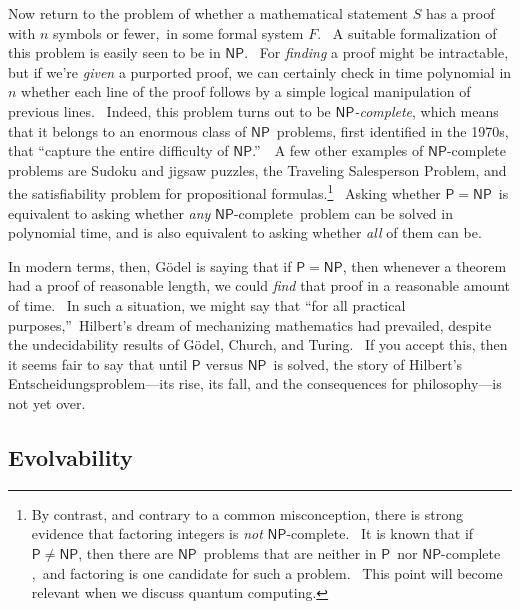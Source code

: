 \documentclass[11pt,onecolumn]{article}%
\begin{document}
Now return to the problem of whether a mathematical statement $S$ has a proof
with $n$ symbols or fewer,\ in some formal system $F$. \ A suitable
formalization of this problem is easily seen to be in $\mathsf{NP}$. \ For
\textit{finding} a proof might be intractable, but if we're \textit{given} a
purported proof, we can certainly check in time polynomial in $n$ whether each
line of the proof follows by a simple logical manipulation of previous lines.
\ Indeed, this problem turns out to be $\mathsf{NP}$\textit{-complete}, which
means that it belongs to an enormous class of $\mathsf{NP}$\ problems, first
identified in the 1970s, that \textquotedblleft capture the entire difficulty
of $\mathsf{NP}$.\textquotedblright\ \ A few other examples of $\mathsf{NP}%
$-complete problems are Sudoku and jigsaw puzzles, the Traveling Salesperson
Problem, and the satisfiability problem for propositional
formulas.\footnote{\label{FACTOR}By contrast, and contrary to a common
misconception, there is strong evidence that factoring integers is
\textit{not} $\mathsf{NP}$-complete. \ It is known that if $\mathsf{P}%
\neq\mathsf{NP}$, then there are $\mathsf{NP}$\ problems that are neither in
$\mathsf{P}$\ nor $\mathsf{NP}$-complete \cite{ladner},\ and factoring is one
candidate for such a problem. \ This point will become relevant when we
discuss quantum computing.} \ Asking whether $\mathsf{P}=\mathsf{NP}$\ is
equivalent to asking whether \textit{any} $\mathsf{NP}$-complete\ problem can
be solved in polynomial time, and is also equivalent to asking whether
\textit{all} of them can be.

In modern terms, then, G\"{o}del is saying that if $\mathsf{P}=\mathsf{NP}$,
then whenever a theorem had a proof of reasonable length, we could
\textit{find} that proof in a reasonable amount of time. \ In such a
situation, we might say that \textquotedblleft for all practical
purposes,\textquotedblright\ Hilbert's dream of mechanizing mathematics had
prevailed, despite the undecidability results of G\"{o}del, Church, and
Turing. \ If you accept this, then it seems fair to say that until
$\mathsf{P}$ versus $\mathsf{NP}$\ is solved, the story of Hilbert's
Entscheidungsproblem---its rise, its fall, and the consequences for
philosophy---is not yet over.

\subsection{Evolvability\label{EVOL}}
\end{document}
